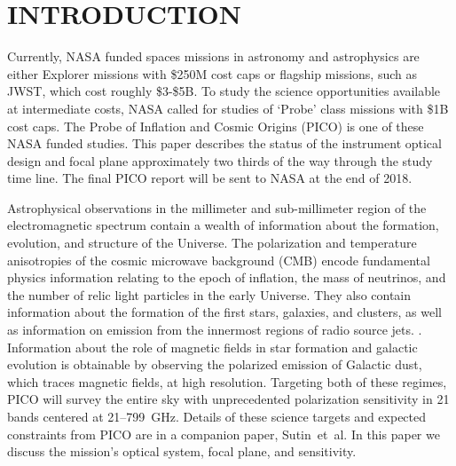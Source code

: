 \documentclass[]{spie}  %
\newcommand{\comb}[1]{\textcolor{blue}{#1}}
\begin{document}


\section{INTRODUCTION}
\label{sec:intro}  


Currently,  NASA funded spaces missions in astronomy and astrophysics are either Explorer missions with \$250M cost caps or 
flagship missions, such as JWST, which cost roughly \$3-\$5B. 
To study the science opportunities available at intermediate costs, NASA called for studies of `Probe' class missions with \$1B cost caps.  The Probe of Inflation 
and Cosmic Origins (PICO) is one of these NASA funded studies.  This paper describes the status of the instrument optical design and focal plane approximately two 
thirds of the way through the study time line.  The final PICO report will be sent to NASA at the end of 2018.

Astrophysical observations in the  millimeter and sub-millimeter region of the electromagnetic spectrum contain a wealth of 
information about the formation, evolution, and structure of the Universe.  
The polarization and temperature anisotropies of the cosmic microwave 
background (CMB) encode fundamental physics information relating to the epoch of inflation, the mass of neutrinos,  
and the number of relic light particles in the early Universe. They also contain information about the formation of 
the first stars, galaxies, and clusters, as well as information on emission from the innermost regions of radio source jets.
.  Information about the role of magnetic fields in star formation and galactic evolution is obtainable 
by observing the polarized emission of Galactic dust, which 
traces magnetic fields, at high resolution. Targeting both of these regimes, PICO will survey the entire sky with 
unprecedented polarization sensitivity 
in 21 bands centered at 21--799~GHz.  Details of these science targets and expected constraints from PICO 
are in a companion paper, Sutin~et~al.\cite{brian_spie} 
In this paper we discuss the mission's optical system, focal plane, and sensitivity.


\end{document}
